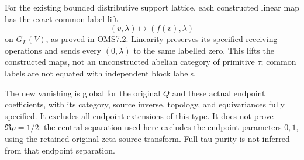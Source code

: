 For the existing bounded distributive support lattice, each constructed
linear map has the exact common-label lift \[
(v,\lambda)\longmapsto(f(v),\lambda)
\] on \(G_L(V)\), as proved in OMS7.2. Linearity preserves its specified
receiving operations and sends every \((0,\lambda)\) to the same
labelled zero. This lifts the constructed maps, not an unconstructed
abelian category of primitive \(\tau\); common labels are not equated
with independent block labels.

The new vanishing is global for the original \(Q\) and these actual
endpoint coefficients, with its category, source inverse, topology, and
equivariances fully specified. It excludes all endpoint extensions of
this type. It does not prove \(\Re\rho=1/2\): the central separation
used here excludes the endpoint parameters \(0,1\), using the retained
original-zeta source transform. Full tau purity is not inferred from
that endpoint separation.
